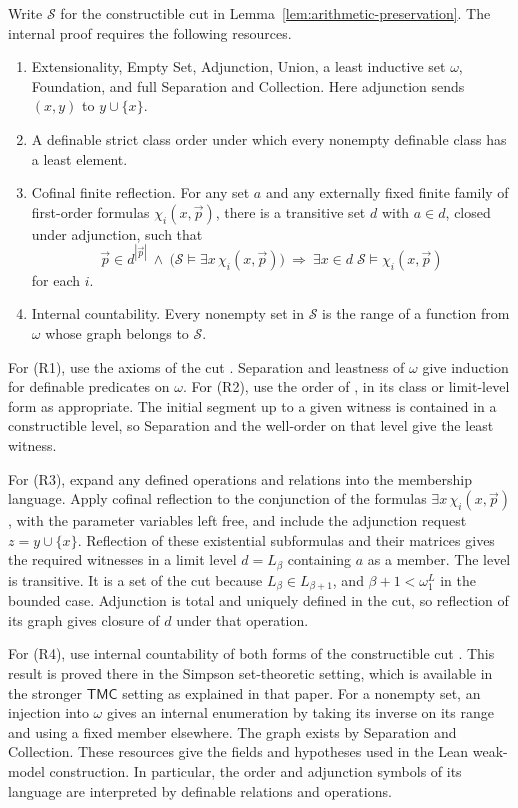 \documentclass[11pt,a4paper]{article}
\numberwithin{equation}{section}
\theoremstyle{definition}
\theoremstyle{remark}
\begin{document}
Write $\mathcal S$ for the constructible cut in Lemma~\ref{lem:arithmetic-preservation}. The internal proof requires the following resources.
\begin{enumerate}[label=\textnormal{(R\arabic*)}]
\item Extensionality, Empty Set, Adjunction, Union, a least inductive set $\omega$, Foundation, and full Separation and Collection. Here adjunction sends $(x,y)$ to $y\cup\{x\}$.
\item A definable strict class order under which every nonempty definable class has a least element.
\item Cofinal finite reflection. For any set $a$ and any externally fixed finite family of first-order formulas $\chi_i(x,\vec p)$, there is a transitive set $d$ with $a\in d$, closed under adjunction, such that
\[
  \vec p\in d^{|\vec p|}\ \land\ \bigl(\mathcal S\models\exists x\,\chi_i(x,\vec p)\bigr)
  \ \Longrightarrow\
  \exists x\in d\;\mathcal S\models\chi_i(x,\vec p)
\]
for each $i$.
\item Internal countability. Every nonempty set in $\mathcal S$ is the range of a function from $\omega$ whose graph belongs to $\mathcal S$.
\end{enumerate}
For (R1), use the axioms of the cut \cite[Theorem 8.6]{kl}. Separation and leastness of $\omega$ give induction for definable predicates on $\omega$. For (R2), use the order of \cite[Lemma 7.3]{kl}, in its class or limit-level form as appropriate. The initial segment up to a given witness is contained in a constructible level, so Separation and the well-order on that level give the least witness.

For (R3), expand any defined operations and relations into the membership language. Apply cofinal reflection \cite[Corollary 8.4 and Lemma 8.5]{kl} to the conjunction of the formulas $\exists x\,\chi_i(x,\vec p)$, with the parameter variables left free, and include the adjunction request $z=y\cup\{x\}$. Reflection of these existential subformulas and their matrices gives the required witnesses in a limit level $d=L_\beta$ containing $a$ as a member. The level is transitive. It is a set of the cut because $L_\beta\in L_{\beta+1}$, and $\beta+1<\omega_1^L$ in the bounded case. Adjunction is total and uniquely defined in the cut, so reflection of its graph gives closure of $d$ under that operation.

For (R4), use internal countability of both forms of the constructible cut \cite[Section 1 and Lemmas 15 and 17(1)]{kl2}. This result is proved there in the Simpson set-theoretic setting, which is available in the stronger $\mathsf{TMC}$ setting as explained in that paper. For a nonempty set, an injection into $\omega$ gives an internal enumeration by taking its inverse on its range and using a fixed member elsewhere. The graph exists by Separation and Collection. These resources give the fields and hypotheses used in the Lean weak-model construction. In particular, the order and adjunction symbols of its language are interpreted by definable relations and operations.
\end{document}
